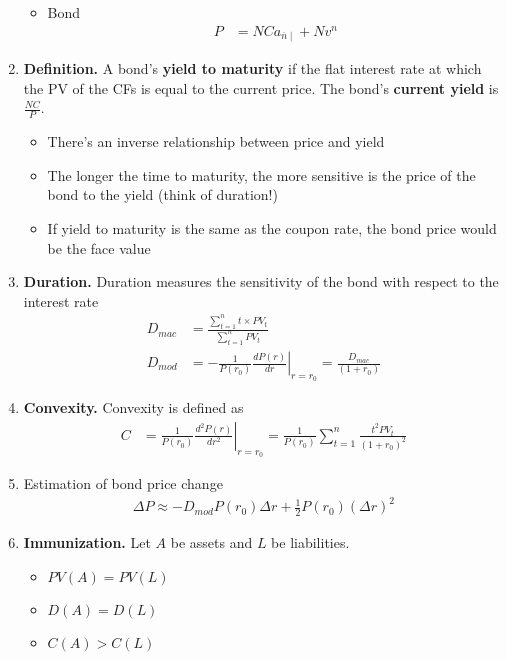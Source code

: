 \documentclass[12pt,twoside]{article}
\begin{document}
\begin{enumerate}
\begin{itemize}
			\item Bond
				\begin{align*}
					P & = NCa_{\overline{n}\mid} + Nv^n
				\end{align*}
		\end{itemize}

	\item \textbf{Definition.} A bond's \textbf{yield to maturity} if the flat interest rate at which the PV of the CFs is equal to the current price. The bond's \textbf{current yield} is $\frac{NC}{P}$.
		\begin{itemize}
			\item There's an inverse relationship between price and yield
			\item The longer the time to maturity, the more sensitive is the price of the bond to the yield (think of duration!)
			\item If yield to maturity is the same as the coupon rate, the bond price would be the face value
		\end{itemize}
		
	\item \textbf{Duration.} Duration measures the sensitivity of the bond with respect to the interest rate
		\begin{align*}
			D_{mac}& = \frac{\sum_{t=1}^n t\times PV_t }{\sum_{t=1}^n PV_t}\\
			D_{mod}& = -\frac{1}{P(r_0)}\left.\frac{dP(r)}{dr}\right\vert_{r=r_0} = \frac{D_{mac}}{(1+r_0)}
		\end{align*}
		
	\item \textbf{Convexity.} Convexity is defined as
		\begin{align*}
			C	&=\frac{1}{P(r_0)}\left.\frac{d^2P(r)}{dr^2}\right\vert_{r=r_0}
				=\frac{1}{P(r_0)}\sum_{t=1}^n \frac{t^2PV_t}{(1+r_0)^2}
		\end{align*}
	
	\item Estimation of bond price change
		\begin{align*}
			\Delta P \approx -D_{mod}P(r_0)\Delta r + \frac{1}{2}P(r_0) (\Delta r)^2
		\end{align*}

	\item \textbf{Immunization.} Let $A$ be assets and $L$ be liabilities.
		\begin{itemize}
			\item $PV(A) = PV(L)$
			\item $D(A) = D(L)$
			\item $C(A) > C(L)$
		\end{itemize}

\end{enumerate}
\end{document}
